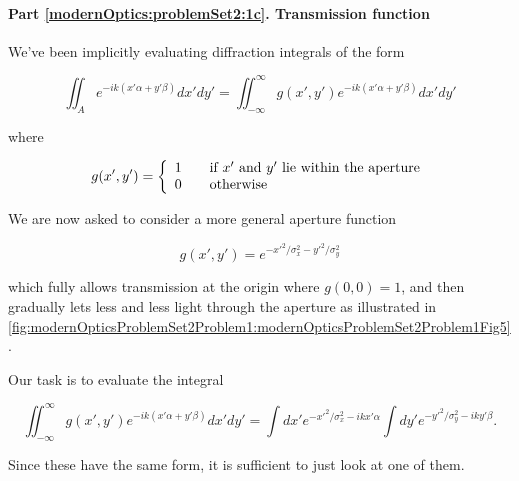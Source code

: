 {%
\paragraph{Part \ref{modernOptics:problemSet2:1c}.  Transmission function}

We've been implicitly evaluating diffraction integrals of the form

\begin{equation}\label{eqn:modernOptics:ProblemSet2:P1:410}
\iint_A e^{-i k( x'\alpha + y' \beta) } dx' dy'
= \iint_{-\infty}^\infty g(x', y') e^{-i k( x'\alpha + y' \beta) } dx' dy'
\end{equation}

where

\begin{equation}\label{eqn:modernOptics:ProblemSet2:P1:430}
g(x', y') =
\left\{
\begin{array}{l l}
1 & \quad \mbox{if $x'$ and $y'$ lie within the aperture} \\
0 & \quad \mbox{otherwise}
\end{array}
\right.
\end{equation}

We are now asked to consider a more general aperture function

\begin{equation}\label{eqn:modernOptics:ProblemSet2:P1:450}
g(x', y') = e^{-{x'}^2/\sigma_x^2 - {y'}^2/\sigma_y^2}
\end{equation}

which fully allows transmission at the origin where $g(0, 0) = 1$, and then gradually lets less and less light through the aperture as illustrated in \cref{fig:modernOpticsProblemSet2Problem1:modernOpticsProblemSet2Problem1Fig5}.


Our task is to evaluate the integral

\begin{equation}\label{eqn:modernOptics:ProblemSet2:P1:470}
\iint_{-\infty}^\infty g(x', y') e^{-i k( x'\alpha + y' \beta) } dx' dy'
=
\int dx' e^{-{x'}^2/\sigma_x^2 -i k x' \alpha}
\int dy' e^{-{y'}^2/\sigma_y^2 -i k y' \beta}.
\end{equation}

Since these have the same form, it is sufficient to just look at one of them.

}
